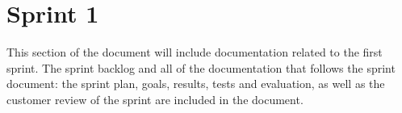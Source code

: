 \documentclass[../document.tex]{subfiles}
\begin{document}
\section{Sprint 1}

This section of the document will include documentation related to the first sprint. The sprint backlog and all of the documentation that follows the sprint document: the sprint plan, goals, results, tests and evaluation, as well as the customer review of the sprint are included in the document.
\end{document}
